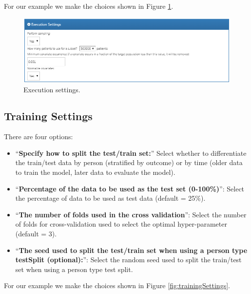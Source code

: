 \documentclass[
  11pt]{book}
\providecommand{\tightlist}{%
  \setlength{\itemsep}{0pt}\setlength{\parskip}{0pt}}
\theoremstyle{definition}
\theoremstyle{definition}
\theoremstyle{definition}
\theoremstyle{definition}
\theoremstyle{remark}
\begin{document}
For our example we make the choices shown in Figure \ref{fig:executionSettings}.

\begin{figure}

{\centering \includegraphics[width=1\linewidth]{images/PatientLevelPrediction/executionSettings} 

}

\caption{Execution settings.}\label{fig:executionSettings}
\end{figure}

\subsection{Training Settings}\label{training-settings}

There are four options:

\begin{itemize}
\tightlist
\item
  ``\textbf{Specify how to split the test/train set:}'' Select whether to differentiate the train/test data by person (stratified by outcome) or by time (older data to train the model, later data to evaluate the model).
\item
  ``\textbf{Percentage of the data to be used as the test set (0-100\%)}'': Select the percentage of data to be used as test data (default = 25\%).
\item
  ``\textbf{The number of folds used in the cross validation}'': Select the number of folds for cross-validation used to select the optimal hyper-parameter (default = 3).
\item
  ``\textbf{The seed used to split the test/train set when using a person type testSplit (optional):}'': Select the random seed used to split the train/test set when using a person type test split.
\end{itemize}

For our example we make the choices shown in Figure \ref{fig:trainingSettings}.
\end{document}
